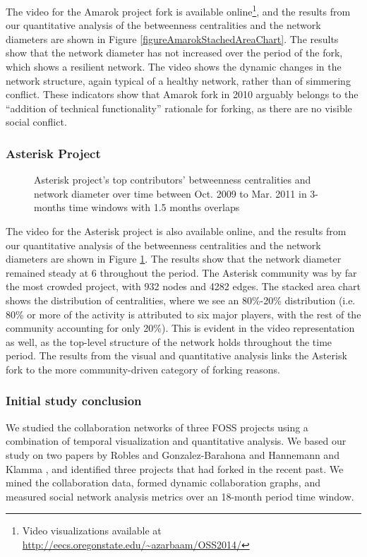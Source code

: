 \documentclass{acm_proc_article-sp}
\begin{document}
The video for the Amarok project fork is available online\footnote{Video visualizations available at \href{http://eecs.oregonstate.edu/~azarbaam/OSS2014/}{http://eecs.oregonstate.edu/\textasciitilde azarbaam/OSS2014/}}, and the results from our quantitative analysis of the betweenness centralities and the network diameters are shown in Figure \ref{figureAmarokStachedAreaChart}. The results show that the network diameter has not increased over the period of the fork, which shows a resilient network. The video shows the dynamic changes in the network structure, again typical of a healthy network, rather than of simmering conflict. These indicators show that Amarok fork in 2010 arguably belongs to the ``addition of technical functionality'' rationale for forking, as there are no visible social conflict.

\subsubsection{Asterisk Project}
\begin{figure}[!Ht]
\centering
{}
\justifying
{}
\caption{Asterisk project's top contributors' betweenness centralities and network diameter over time between Oct. 2009 to Mar. 2011 in 3-months time windows with 1.5 months overlaps}
\label{figureAsteriskStackedAreaChart}
\end{figure}

The video for the Asterisk project is also available online, and the results from our quantitative analysis of the betweenness centralities and the network diameters are shown in Figure \ref{figureAsteriskStackedAreaChart}. The results show that the network diameter remained steady at 6 throughout the period. The Asterisk community was by far the most crowded project, with 932 nodes and 4282 edges. The stacked area chart shows the distribution of centralities, where we see an 80\%-20\% distribution (i.e. 80\% or more of the activity is attributed to six major players, with the rest of the community accounting for only 20\%). This is evident in the video representation as well, as the top-level structure of the network holds throughout the time period. The results from the visual and quantitative analysis links the Asterisk fork to the more community-driven category of forking reasons.

\subsubsection{Initial study conclusion}
We studied the collaboration networks of three FOSS projects using a combination of temporal visualization and quantitative analysis. We based our study on two papers by Robles and Gonzalez-Barahona \cite{Robles} and Hannemann and Klamma \cite{Hannemann}, and identified three projects that had forked in the recent past. We mined the collaboration data, formed dynamic collaboration graphs, and measured social network analysis metrics over an 18-month period time window.
\end{document}
